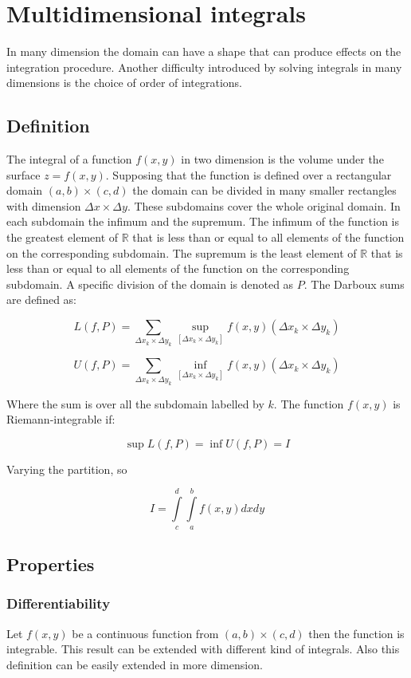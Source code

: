\chapter{Multidimensional integrals}
In many dimension the domain can have a shape that can produce effects on the integration procedure.
Another difficulty introduced by solving integrals in many dimensions is the choice of order of integrations.

\section{Definition}
The integral of a function $f(x,y)$ in two dimension is the volume under the surface $z = f(x,y)$.
Supposing that the function is defined over a rectangular domain $(a,b)\times (c,d)$ the domain can be divided in many smaller rectangles with dimension $\Delta x\times \Delta y$.
These subdomains cover the whole original domain.
In each subdomain the infimum and the supremum.
The infimum of the function is the greatest element of $\mathbb{R}$ that is less than or equal to all elements of the function on the corresponding subdomain.
The supremum is the least element of $\mathbb{R}$ that is less than or equal to all elements of the function on the corresponding subdomain.
A specific division of the domain is denoted as $P$.
The Darboux sums are defined as:

$$L(f,P)= \sum\limits_{\Delta x_k\times \Delta y_k}\sup\limits_{[\Delta x_k\times \Delta y_k]} f(x,y)(\Delta x_k\times \Delta y_k)$$

$$U(f,P)= \sum\limits_{\Delta x_k\times \Delta y_k}\inf\limits_{[\Delta x_k\times \Delta y_k]} f(x,y)(\Delta x_k\times \Delta y_k)$$

Where the sum is over all the subdomain labelled by $k$.
The function $f(x,y)$ is Riemann-integrable if:

$$\sup L(f,P) = \inf U(f,P) = I$$

Varying the partition, so

$$I = \int\limits_c^d\int\limits_a^bf(x,y)dxdy$$

\section{Properties}

	\subsection{Differentiability}
	Let $f(x,y)$ be a continuous function from $(a,b)\times (c,d)$ then the function is integrable.
	This result can be extended with different kind of integrals.
	Also this definition can be easily extended in more dimension.

